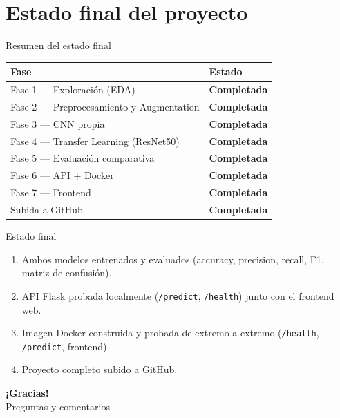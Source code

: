 \documentclass[aspectratio=169]{beamer}
\begin{document}
\section{Estado final del proyecto}

\begin{frame}{Resumen del estado final}
  \centering
  \begin{tabular}{p{5.2cm}p{3.5cm}}
    \toprule
    \textbf{Fase} & \textbf{Estado} \\
    \midrule
    Fase 1 — Exploración (EDA) & \textcolor{okgreen}{\textbf{Completada}} \\
    Fase 2 — Preprocesamiento y Augmentation & \textcolor{okgreen}{\textbf{Completada}} \\
    Fase 3 — CNN propia & \textcolor{okgreen}{\textbf{Completada}} \\
    Fase 4 — Transfer Learning (ResNet50) & \textcolor{okgreen}{\textbf{Completada}} \\
    Fase 5 — Evaluación comparativa & \textcolor{okgreen}{\textbf{Completada}} \\
    Fase 6 — API + Docker & \textcolor{okgreen}{\textbf{Completada}} \\
    Fase 7 — Frontend & \textcolor{okgreen}{\textbf{Completada}} \\
    Subida a GitHub & \textcolor{okgreen}{\textbf{Completada}} \\
    \bottomrule
  \end{tabular}
\end{frame}

\begin{frame}{Estado final}
  \begin{enumerate}
    \item Ambos modelos entrenados y evaluados (accuracy, precision, recall, F1, matriz de confusión).
    \item API Flask probada localmente (\texttt{/predict}, \texttt{/health}) junto con el frontend web.
    \item Imagen Docker construida y probada de extremo a extremo (\texttt{/health}, \texttt{/predict}, frontend).
    \item Proyecto completo subido a GitHub.
  \end{enumerate}
\end{frame}

\begin{frame}
  \centering
  \Large \textbf{¡Gracias!}\\[0.5cm]
  \normalsize Preguntas y comentarios
\end{frame}
\end{document}
